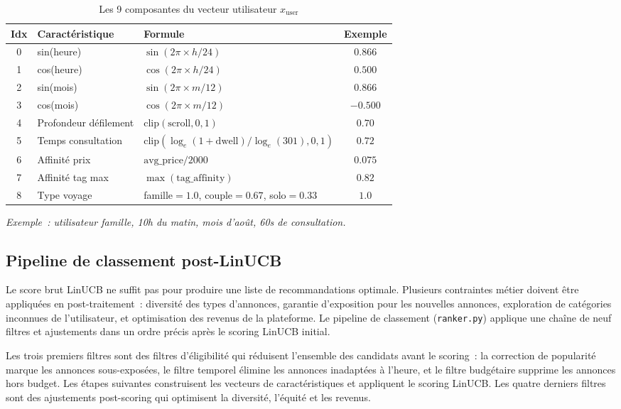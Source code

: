 \begin{table}[H]
    \centering
    \caption{Les 9 composantes du vecteur utilisateur $x_{\text{user}}$}
    \label{tab:user_vector}
    \small
    \begin{tabular}{c l l c}
        \toprule
        \textbf{Idx} & \textbf{Caractéristique} & \textbf{Formule} &
        \textbf{Exemple} \\
        \midrule
        0 & sin(heure) & $\sin(2\pi \times h / 24)$ & $0.866$ \\
        1 & cos(heure) & $\cos(2\pi \times h / 24)$ & $0.500$ \\
        2 & sin(mois) & $\sin(2\pi \times m / 12)$ & $0.866$ \\
        3 & cos(mois) & $\cos(2\pi \times m / 12)$ & $-0.500$ \\
        4 & Profondeur défilement & $\text{clip}(\text{scroll}, 0, 1)$ & $0.70$ \\
        5 & Temps consultation & $\text{clip}(\log_e(1+\text{dwell})/\log_e(301), 0, 1)$ & $0.72$ \\
        6 & Affinité prix & $\text{avg\_price} / 2000$ & $0.075$ \\
        7 & Affinité tag max & $\max(\text{tag\_affinity})$ & $0.82$ \\
        8 & Type voyage & famille$=1.0$, couple$=0.67$, solo$=0.33$ & $1.0$ \\
        \bottomrule
    \end{tabular}
    \vspace{0.2cm}
    \footnotesize
    \textit{Exemple~: utilisateur famille, 10h du matin, mois d'août, 60s de consultation.}
\end{table}


\subsection{Pipeline de classement post-LinUCB}

Le score brut LinUCB ne suffit pas pour produire une liste de recommandations optimale. Plusieurs
contraintes métier doivent être appliquées en post-traitement~: diversité des types d'annonces,
garantie d'exposition pour les nouvelles annonces, exploration de catégories inconnues de
l'utilisateur, et optimisation des revenus de la plateforme. Le pipeline de classement
(\texttt{ranker.py}) applique une chaîne de neuf filtres et ajustements dans un ordre précis
après le scoring LinUCB initial.

Les trois premiers filtres sont des filtres d'éligibilité qui réduisent l'ensemble des candidats
avant le scoring~: la correction de popularité marque les annonces sous-exposées, le filtre
temporel élimine les annonces inadaptées à l'heure, et le filtre budgétaire supprime les annonces
hors budget. Les étapes suivantes construisent les vecteurs de caractéristiques et appliquent
le scoring LinUCB. Les quatre derniers filtres sont des ajustements post-scoring qui optimisent
la diversité, l'équité et les revenus.

